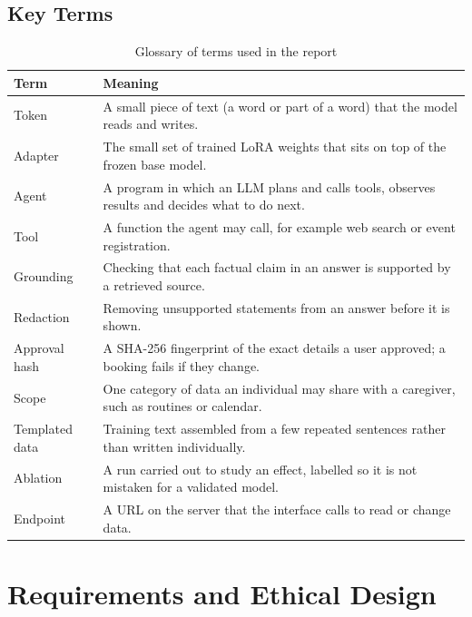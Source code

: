 \documentclass[11pt,a4paper]{article}
\begin{document}
\subsection{Key Terms}
\begin{table}[H]
\centering
\caption{Glossary of terms used in the report}
\label{tab:glossary}
\small
\begin{tabularx}{\textwidth}{@{}lY@{}}
\toprule
\textbf{Term} & \textbf{Meaning}\\
\midrule
Token & A small piece of text (a word or part of a word) that the model reads and writes.\\
Adapter & The small set of trained LoRA weights that sits on top of the frozen base model.\\
Agent & A program in which an LLM plans and calls tools, observes results and decides what to do next.\\
Tool & A function the agent may call, for example web search or event registration.\\
Grounding & Checking that each factual claim in an answer is supported by a retrieved source.\\
Redaction & Removing unsupported statements from an answer before it is shown.\\
Approval hash & A SHA-256 fingerprint of the exact details a user approved; a booking fails if they change.\\
Scope & One category of data an individual may share with a caregiver, such as routines or calendar.\\
Templated data & Training text assembled from a few repeated sentences rather than written individually.\\
Ablation & A run carried out to study an effect, labelled so it is not mistaken for a validated model.\\
Endpoint & A URL on the server that the interface calls to read or change data.\\
\bottomrule
\end{tabularx}
\end{table}

\section{Requirements and Ethical Design}\label{sec:requirements}
\end{document}
